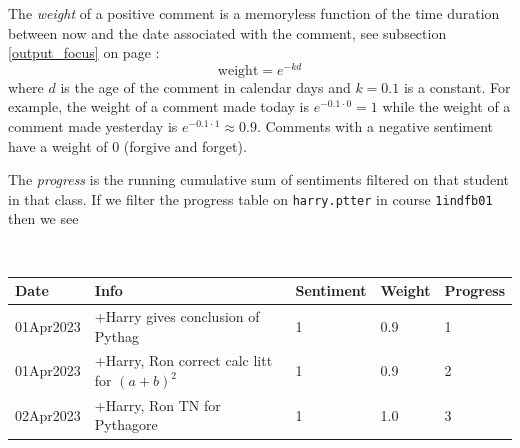 \documentclass[10pt]{article}
\begin{document}
The \emph{weight} of a positive comment is a memoryless function of the time duration between now and the date associated with the comment, see subsection \ref{output_focus} on page \pageref{output_focus}:
$$ \mathrm{weight} = e^{-kd} $$
where $d$ is the age of the comment in calendar days and $k = 0.1$ is a constant. For example, the weight of a comment made today is $e^{-0.1 \cdot 0} = 1$ while the weight of a comment made yesterday is $e^{-0.1 \cdot 1} \approx 0.9$. Comments with a negative sentiment have a weight of 0 (forgive and forget).

The \emph{progress} is the running cumulative sum of sentiments filtered on that student in that class. If we filter the progress table on \texttt{harry.ptter} in course \texttt{1indfb01} then we see

\

{\footnotesize
\hspace{-6mm}
\begin{tabular}{|l|l|l|l|l|}
\hline
\textbf{Date} & \textbf{Info}                                                               & \textbf{Sentiment} & \textbf{Weight} & \textbf{Progress} \\ \hline
01Apr2023     & +Harry gives conclusion of Pythag                                           & 1                  & 0.9             & 1                 \\ \hline
01Apr2023     & +Harry, Ron correct calc litt for $(a+b)^2$ & 1                  & 0.9             & 2                 \\ \hline
02Apr2023     & +Harry, Ron TN for Pythagore                                                & 1                  & 1.0             & 3                 \\ \hline
\end{tabular}
}
\end{document}

